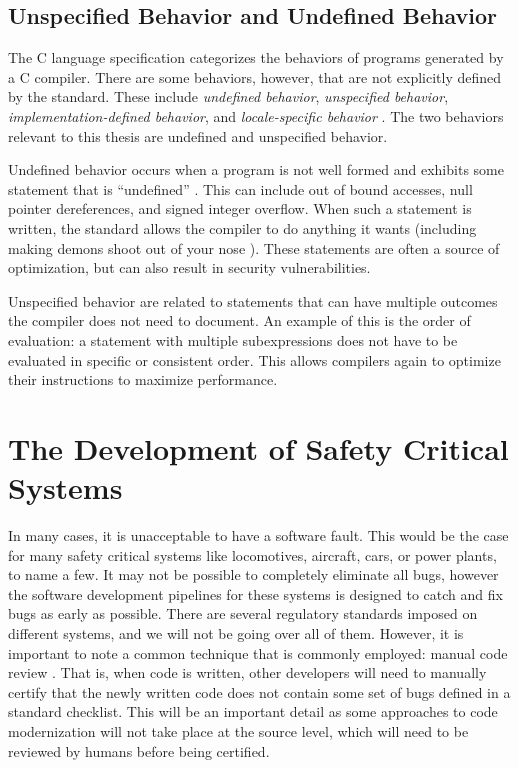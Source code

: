 \subsection{Unspecified Behavior and Undefined Behavior}
The C language specification categorizes the behaviors of programs generated by a C compiler. There are some behaviors, however, that are not explicitly defined by the standard. These include \textit{undefined behavior}, \textit{unspecified behavior}, \textit{implementation-defined behavior}, and \textit{locale-specific behavior} \cite{c_standard}. The two behaviors relevant to this thesis are undefined and unspecified behavior.

Undefined behavior occurs when a program is not well formed and exhibits some statement that is ``undefined'' \cite{c_standard}. This can include out of bound accesses, null pointer dereferences, and signed integer overflow. When such a statement is written, the standard allows the compiler to do anything it wants (including making demons shoot out of your nose \cite{nasal_demons}). These statements are often a source of optimization, but can also result in security vulnerabilities.

Unspecified behavior are related to statements that can have multiple outcomes the compiler does not need to document. An example of this is the order of evaluation: a statement with multiple subexpressions does not have to be evaluated in specific or consistent order. This allows compilers again to optimize their instructions to maximize performance.

\section{The Development of Safety Critical Systems}

In many cases, it is unacceptable to have a software fault. This would be the case for many safety critical systems like locomotives, aircraft, cars, or power plants, to name a few. It may not be possible to completely eliminate all bugs, however the software development pipelines for these systems is designed to catch and fix bugs as early as possible. There are several regulatory standards imposed on different systems, and we will not be going over all of them. However, it is important to note a common technique that is commonly employed: manual code review \cite{faa}\cite{do}. That is, when code is written, other developers will need to manually certify that the newly written code does not contain some set of bugs defined in a standard checklist. This will be an important detail as some approaches to code modernization will not take place at the source level, which will need to be reviewed by humans before being certified. 

